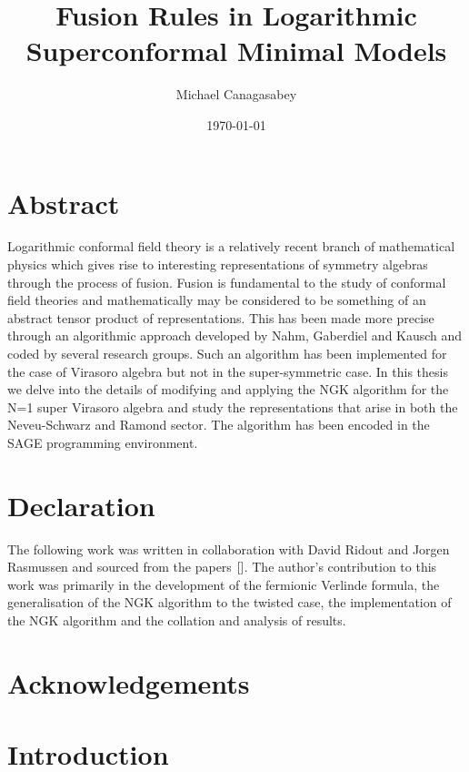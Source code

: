 \documentclass[a4paper,reqno,12pt]{report}
\theoremstyle{definition}
\numberwithin{equation}{section}
\theoremstyle{plain}
\begin{document}
\title{Fusion Rules in Logarithmic Superconformal Minimal Models }
\date{\today}
\author{Michael Canagasabey}

\maketitle

\chapter*{Abstract}
Logarithmic conformal field theory is a relatively recent branch of mathematical physics which gives rise to interesting representations of symmetry algebras through the process of fusion. Fusion is fundamental to the study of conformal field theories and mathematically may be considered to be something of an abstract tensor product of representations. This has been made more precise through an algorithmic approach developed by Nahm, Gaberdiel and Kausch and coded by several research groups. Such an algorithm has been implemented for the case of Virasoro algebra but not in the super-symmetric case. In this thesis we delve into the details of modifying and applying the NGK algorithm for the N=1 super Virasoro algebra and study the representations that arise in both the Neveu-Schwarz and Ramond sector. The algorithm has been encoded in the SAGE programming environment.

\chapter*{Declaration}

The following work was written  in collaboration with David Ridout and Jorgen Rasmussen and sourced from the papers $\cite{}$. The author's contribution to this work was primarily in the development of the fermionic Verlinde formula, the generalisation of the NGK algorithm to the twisted case, the implementation of the NGK algorithm and the collation and analysis of results. 

\chapter*{Acknowledgements}

\tableofcontents

\chapter*{Introduction}
\end{document}
